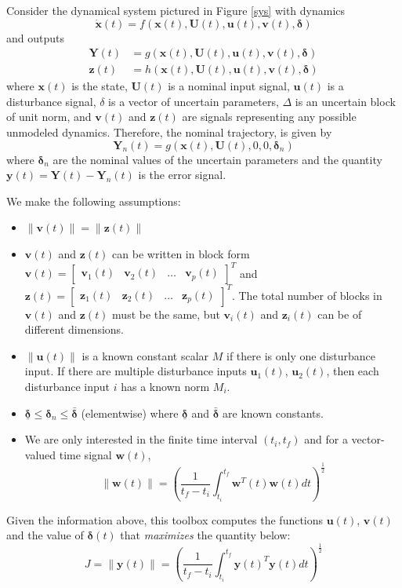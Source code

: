 \documentclass{article}
\newcommand{\xb}{\mathbf{x}}
\newcommand{\ub}{\mathbf{u}}
\newcommand{\vb}{\mathbf{v}}
\newcommand{\zb}{\mathbf{z}}
\newcommand{\deltab}{\bm{\delta}}
\newcommand{\Ub}{\mathbf{U}}
\newcommand{\Yb}{\mathbf{Y}}
\newcommand{\yb}{\mathbf{y}}
\begin{document}
Consider the dynamical system pictured in Figure \ref{sys} with dynamics
\[ \dot{\xb}(t) = f(\xb(t),\Ub(t),\ub(t),\vb(t),\deltab) \]
and outputs
\begin{align*}
\Yb(t) &= g(\xb(t),\Ub(t),\ub(t),\vb(t),\deltab) \\
\zb(t) &= h(\xb(t),\Ub(t),\ub(t),\vb(t),\deltab)
\end{align*}
where $\xb(t)$ is the state, $\Ub(t)$ is a nominal input signal, $\ub(t)$ is a
disturbance signal, $\delta$ is a vector of uncertain parameters, $\Delta$ is
an uncertain block of unit norm, and $\vb(t)$ and $\zb(t)$ are signals
representing any possible unmodeled dynamics. Therefore, the nominal
trajectory, is given by
\[ \Yb_n(t) = g(\xb(t),\Ub(t),0,0,\deltab_n) \]
where $\deltab_n$ are the nominal values of the uncertain parameters and the
quantity $\yb(t) = \Yb(t) - \Yb_n(t)$ is the error signal.


We make the following assumptions:
\begin{itemize}
	\item $\|\vb(t)\| = \|\zb(t)\|$
	\item $\vb(t)$ and $\zb(t)$ can be written in block form $\vb(t) =
	      \begin{bmatrix} \vb_1(t) & \vb_2(t) & \dots & \vb_p(t) 
		  \end{bmatrix}^T$
		  and $\zb(t) = \begin{bmatrix} \zb_1(t) & \zb_2(t) & \dots & \zb_p(t)
		  \end{bmatrix}^T$. The total number of blocks in $\vb(t)$
		  and $\zb(t)$ must be the same, but $\vb_i(t)$ and $\zb_i(t)$ can be of
		  different dimensions.
    \item $\|\ub(t)\|$ is a known constant scalar $M$ if there is only one
    	  disturbance input. If there are multiple disturbance inputs
		  $\ub_1(t)$, $\ub_2(t)$, then each disturbance input $i$ has a known 
		  norm $M_i$.
	\item $\underline{\deltab} \le \deltab_n \le \bar{\deltab}$ (elementwise) 
	      where $\underline{\deltab}$ and $\bar{\deltab}$ are known constants.
	\item We are only interested in the finite time interval $(t_i, t_f)$ and 
	      for a vector-valued time signal $\mathbf{w}(t)$, \[\|\mathbf{w}(t)\|  
		  = \left (\frac{1}{t_f-t_i} \int_{t_i}^{t_f}\mathbf{w}^T(t) 
		  \mathbf{w}(t) dt \right )^{\frac{1}{2}}\]
\end{itemize}

Given the information above, this toolbox computes the functions $\ub(t)$,
$\vb(t)$ and the value of $\deltab(t)$ that \emph{maximizes} the quantity
below: 
\[ J =  \|\yb(t)\| = \left ( \frac{1}{t_f - t_i} \int_{t_i}^{t_f} \yb(t)^T
\yb(t) dt \right )^{\frac{1}{2}}  \]
\end{document}
